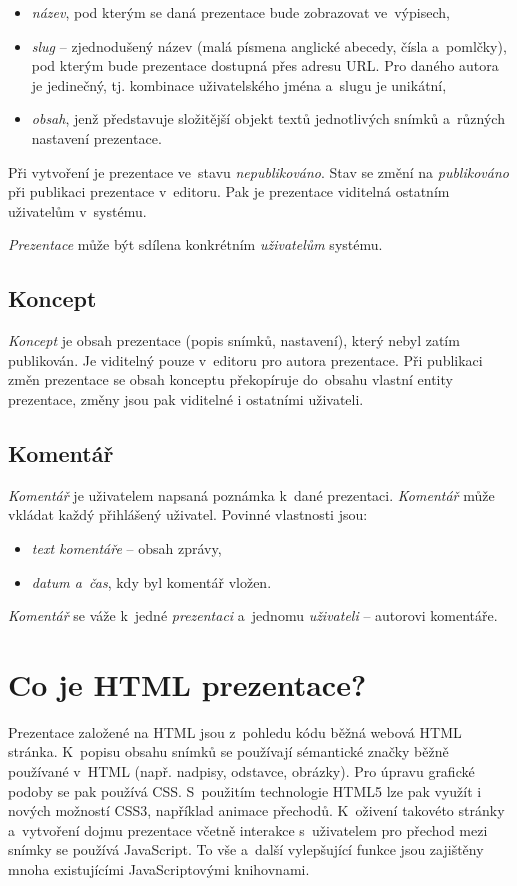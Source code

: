 \documentclass[11pt,twoside,a4paper]{book}
\newcommand*{\nom}[2]{#1\nomenclature{#1}{#2}} 			%
\begin{document}
\begin{itemize}
	\item \textit{název}, pod kterým se daná prezentace bude zobrazovat ve~výpisech,
	\item \textit{slug} – zjednodušený název (malá písmena anglické abecedy, čísla a~pomlčky), pod kterým bude prezentace dostupná přes adresu URL. Pro daného autora je jedinečný, tj. kombinace uživatelského jména a~slugu je unikátní,
	\item \textit{obsah}, jenž představuje složitější objekt textů jednotlivých snímků a~různých nastavení prezentace.
\end{itemize}

Při vytvoření je prezentace ve~stavu \textit{nepublikováno}. Stav se změní na \textit{publikováno} při publikaci prezentace v~editoru. Pak je prezentace viditelná ostatním uživatelům v~systému.

\textit{Prezentace} může být sdílena konkrétním \textit{uživatelům} systému.


\subsection{Koncept}
\textit{Koncept} je obsah prezentace (popis snímků, nastavení), který nebyl zatím publikován. Je viditelný pouze v~editoru pro autora prezentace. Při publikaci změn prezentace se obsah konceptu překopíruje do~obsahu vlastní entity prezentace, změny jsou pak viditelné i ostatními uživateli.


\subsection{Komentář}
\textit{Komentář} je uživatelem napsaná poznámka k~dané prezentaci. \textit{Komentář} může vkládat každý přihlášený uživatel. Povinné vlastnosti jsou:

\begin{itemize}
	\item \textit{text komentáře} – obsah zprávy,
	\item \textit{datum a~čas}, kdy byl komentář vložen.
\end{itemize}

\textit{Komentář} se váže k~jedné \textit{prezentaci} a~jednomu \textit{uživateli} – autorovi komentáře.



\section{Co je HTML prezentace?}
Prezentace založené na HTML jsou z~pohledu kódu běžná webová HTML stránka. K~popisu obsahu snímků se používají sémantické značky běžně používané v~HTML (např. nadpisy, odstavce, obrázky). Pro úpravu grafické podoby se pak používá \nom{CSS}{Cascading Style Sheets}. S~použitím technologie HTML5 lze pak využít i nových možností CSS3, například animace přechodů. K~oživení takovéto stránky a~vytvoření dojmu prezentace včetně interakce s~uživatelem pro přechod mezi snímky se používá Java\-Script. To vše a~další vylepšující funkce jsou zajištěny mnoha existujícími Java\-Scriptovými knihovnami.
\end{document}
